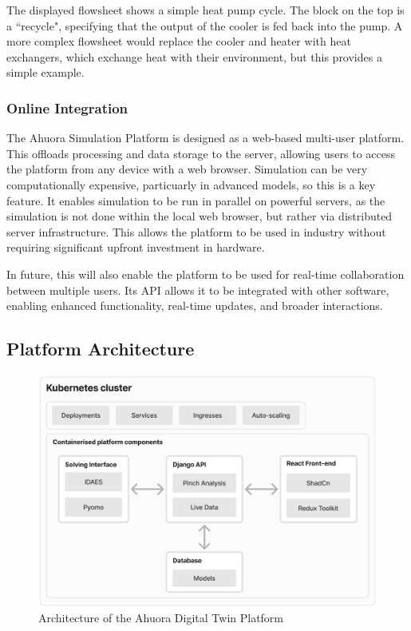 The displayed flowsheet shows a simple heat pump cycle. The block on the top is a ``recycle", specifying that the output of the cooler is fed back into the pump. A more complex flowsheet would replace the cooler and heater with heat exchangers, which exchange heat with their environment, but this provides a simple example.

\subsubsection{Online Integration}

The Ahuora Simulation Platform is designed as a web-based multi-user platform. This offloads processing and data storage to the server, allowing users to access the platform from any device with a web browser. Simulation can be very computationally expensive, particuarly in advanced models, so this is a key feature. It enables simulation to be run in parallel on powerful servers, as the simulation is not done within the local web browser, but rather via distributed server infrastructure. This allows the platform to be used in industry without requiring significant upfront investment in hardware. 

In future, this will also enable the platform to be used for real-time collaboration between multiple users. Its API allows it to be integrated with other software, enabling enhanced functionality, real-time updates, and broader interactions.

\subsection{Platform Architecture}

\begin{figure}[h]
    \centering
    \includegraphics[width=\textwidth]{preface/dt_arch.png}
    \caption{Architecture of the Ahuora Digital Twin Platform}
    \label{sec:platform_architecture}
\end{figure}

